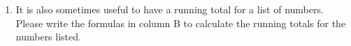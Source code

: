 \documentclass[a4paper]{article}
\begin{document}
\begin{enumerate}

\newpage
\item It is also sometimes useful to have a running total for a list of numbers. Please write the formulas in column B to calculate the running totals for the numbers listed.


\end{enumerate}
\newpage
\end{document}
